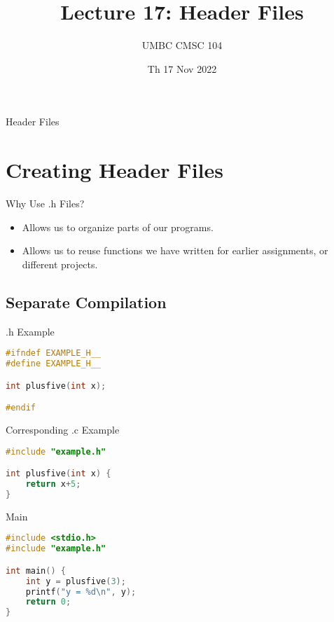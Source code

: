 \documentclass[graphics]{beamer}
\title{Lecture 17: Header Files}
\author{UMBC CMSC 104}
\date{Th 17 Nov 2022}
\begin{document}
\begin{frame}{}
\centering
    Header Files
\end{frame}

\frame{\tableofcontents}

\section{Creating Header Files}
\begin{frame}{Why Use .h Files?}
    \begin{itemize}
        \item Allows us to organize parts of our programs.
        \item Allows us to reuse functions we have written for earlier assignments, or different projects.
    \end{itemize}
\end{frame}

\subsection{Separate Compilation}
\begin{frame}[fragile]{.h Example}
    \begin{lstlisting}[language=C,basicstyle=\footnotesize,keywordstyle=\color{blue},commentstyle=\color{green},showstringspaces=false,stringstyle=\color{red}]
#ifndef EXAMPLE_H__
#define EXAMPLE_H__

int plusfive(int x);

#endif
    \end{lstlisting}
\end{frame}

\begin{frame}[fragile]{Corresponding .c Example}
    \begin{lstlisting}[language=C,basicstyle=\footnotesize,keywordstyle=\color{blue},commentstyle=\color{green},showstringspaces=false,stringstyle=\color{red}]
#include "example.h"

int plusfive(int x) {
    return x+5;
}
    \end{lstlisting}
\end{frame}

\begin{frame}[fragile]{Main}
    \begin{lstlisting}[language=C,basicstyle=\footnotesize,keywordstyle=\color{blue},commentstyle=\color{green},showstringspaces=false,stringstyle=\color{red}]
#include <stdio.h>
#include "example.h"

int main() {
    int y = plusfive(3);
    printf("y = %d\n", y);
    return 0;
}
    \end{lstlisting}
\end{frame}
\end{document}
